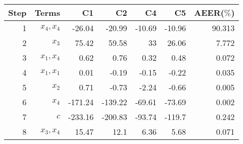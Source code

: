 \begin{tabular}{rrrrrrr}
Step & Terms & C1 & C2 & C4 & C5 & AEER($\%$) \\ 
\hline 
1 & $x_4,x_4$ & -26.04 & -20.99 & -10.69 & -10.96 & 90.313 \\ 
2 & $x_3$ & 75.42 & 59.58 & 33 & 26.06 & 7.772 \\ 
3 & $x_1,x_4$ & 0.62 & 0.76 & 0.32 & 0.48 & 0.072 \\ 
4 & $x_1,x_1$ & 0.01 & -0.19 & -0.15 & -0.22 & 0.035 \\ 
5 & $x_2$ & 0.71 & -0.73 & -2.24 & -0.66 & 0.005 \\ 
6 & $x_4$ & -171.24 & -139.22 & -69.61 & -73.69 & 0.002 \\ 
7 & $c$ & -233.16 & -200.83 & -93.74 & -119.7 & 0.242 \\ 
8 & $x_3,x_4$ & 15.47 & 12.1 & 6.36 & 5.68 & 0.071 \\ 
\hline 
\end{tabular}